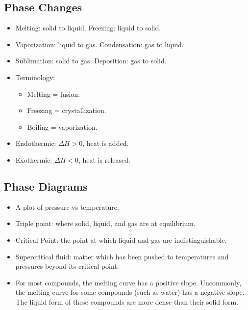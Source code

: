 \documentclass{article}
\begin{document}
\subsection{Phase Changes}

\begin{itemize}
    \item Melting: solid to liquid. Freezing: liquid to solid.
    \item Vaporization: liquid to gas. Condensation: gas to liquid.
    \item Sublimation: solid to gas. Deposition: gas to solid.
    \item Terminology:
    \begin{itemize}
        \item Melting = fusion.
        \item Freezing = crystallization.
        \item Boiling = vaporization.
    \end{itemize}
    \item Endothermic: $\Delta H > 0$, heat is added.
    \item Exothermic: $\Delta H < 0$, heat is released.
\end{itemize}

\subsection{Phase Diagrams}

\begin{itemize}
    \item A plot of pressure vs temperature.
    \item Triple point: where solid, liquid, and gas are at equilibrium.
    \item Critical Point: the point at which liquid and gas are indistinguishable.
    \item Supercritical fluid: matter which has been pushed to temperatures and pressures beyond its critical point.
    \item For most compounds, the melting curve has a positive slope. Uncommonly, the melting curve for some compounds (such as water) has a negative slope. The liquid form of these compounds are more dense than their solid form.
\end{itemize}
\end{document}
